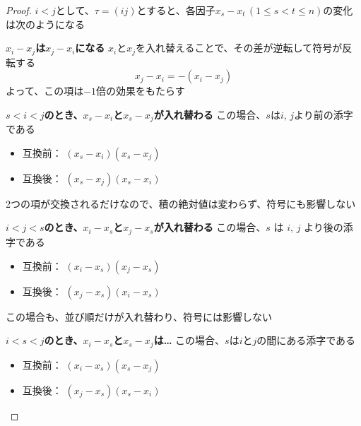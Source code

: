 \documentclass[../../../topic_linear-algebra]{subfiles}
\begin{document}
\begin{proof}
  $i<j$として、$\tau = (ij)$とすると、各因子$x_s - x_t \, (1 \leq s < t \leq n)$の変化は次のようになる

  \begin{subpattern}{\bfseries $x_i - x_j$は$x_j - x_i$になる}
    $x_i$と$x_j$を入れ替えることで、その差が逆転して符号が反転する
    \begin{equation*}
      x_j - x_i = -(x_i - x_j)
    \end{equation*}
    よって、この項は$-1$倍の効果をもたらす
  \end{subpattern}

  \begin{subpattern}{\bfseries $s < i < j$のとき、$x_s - x_i$と$x_s - x_j$が入れ替わる}
    この場合、$s$は$i,\, j$より前の添字である

    \begin{itemize}
      \item 互換前： $(x_s - x_i)(x_s - x_j)$
      \item 互換後： $(x_s - x_j)(x_s - x_i)$
    \end{itemize}

    2つの項が交換されるだけなので、積の絶対値は変わらず、符号にも影響しない
  \end{subpattern}

  \begin{subpattern}{\bfseries $i < j < s$のとき、$x_i - x_s$と$x_j - x_s$が入れ替わる}
    この場合、$s$ は $i,\, j$ より後の添字である

    \begin{itemize}
      \item 互換前： $(x_i - x_s)(x_j - x_s)$
      \item 互換後： $(x_j - x_s)(x_i - x_s)$
    \end{itemize}

    この場合も、並び順だけが入れ替わり、符号には影響しない
  \end{subpattern}

  \begin{subpattern}{\bfseries $i < s < j$のとき、$x_i - x_s$と$x_s - x_j$は…}
    この場合、$s$は$i$と$j$の間にある添字である

    \begin{itemize}
      \item 互換前： $(x_i - x_s)(x_s - x_j)$
      \item 互換後： $(x_j - x_s)(x_s - x_i)$
    \end{itemize}


\end{subpattern}
\end{proof}
\end{document}
